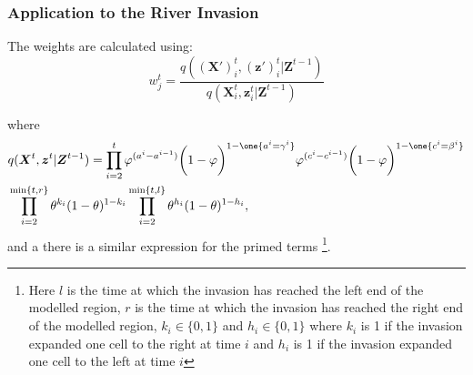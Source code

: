 \documentclass[9pt, xcolor={dvipsnames,svgnames,table}]{beamer}
\begin{document}
\begin{frame}
\frametitle{Application to the River Invasion}

The weights are calculated using:
\begin{equation*}
    w^t_j = \frac{q(\bm{(X')}^{t}_i,\bm{(z')}^{t}_i | \bm{Z}^{t-1})}{q(\bm{X}^{t}_i,\bm{z}^{t}_i | \bm{Z}^{t-1})}
\end{equation*}

where
\begin{align*}
    & q(\bm{X}^{t},\bm{z}^{t} | \bm{Z}^{t-1}) =  \prod_{i=2}^{t} \varphi^{(a^{i} - a^{i-1})}\bigg(1 - \varphi \bigg)^{1-\one {a^i=\gamma^i}} \nonumber \varphi^{(c^{i} - c^{i-1})} \bigg(1 - \varphi\bigg)^{1-\one {c^i=\beta^i}} \\ &\prod_{i=2}^{\min\{t,r\}} \theta^{k_i} (1-\theta)^{1-k_i}  \label{eq:4} \prod_{i=2}^{\min\{t,l\}} \theta^{h_i} (1-\theta)^{1-h_i} \nonumber,
\end{align*}
and a there is a similar expression for the primed terms \footnote{Here $l$ is the time at which the invasion has reached the left end of the modelled region, $r$ is the time at which the invasion has reached the right end of the modelled region, $k_i \in \{0,1\}$ and $h_i \in \{0,1\}$ where $k_i$ is 1 if the invasion expanded one cell to the right at time $i$ and $h_i$ is 1 if the invasion expanded one cell to the left at time $i$}.

\end{frame}
\end{document}
